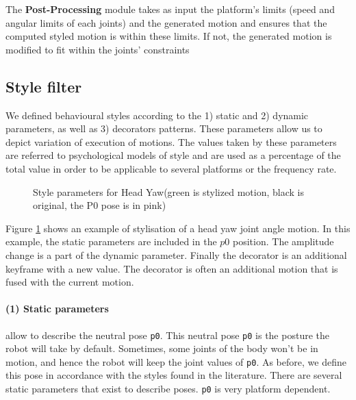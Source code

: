 \documentclass[smallextended]{svjour3}
\begin{document}
The \textbf{Post-Processing} module takes as input the platform's limits (speed and angular limits of each joints) and the generated motion and ensures that the computed styled motion is within these limits.
If not, the generated motion is modified to fit within the joints' constraints



\subsection{Style filter}
\label{ssec:bss}
We defined behavioural styles according to the 1) static and 2) dynamic parameters, as well as 3) decorators patterns. 
These parameters allow us to depict variation of execution of motions.
The values taken by these parameters are referred to psychological models of style and are used as a percentage of the total value in order to be applicable to several platforms or the frequency rate.
\begin{figure}
	\centering
	\caption{Style parameters for Head Yaw(green is stylized motion, black is original, the P0 pose is in pink)}
	\label{fig:styles_parameters}
\end{figure}

Figure \ref{fig:styles_parameters} shows an example of stylisation of a head yaw joint angle motion.
In this example, the static parameters are included in the $p0$ position.
The amplitude change is a part of the dynamic parameter. 
Finally the decorator is an additional keyframe with a new value. 
The decorator is often an additional motion that is fused with the current motion.

\paragraph{(1) Static parameters} allow to describe the neutral pose \texttt{p0}. 
This neutral pose \texttt{p0} is the posture the robot will take by default.
Sometimes, some joints of the body won't be in motion,  and hence the robot will keep the joint values of \texttt{p0}.
As before, we define this pose in accordance with the styles found in the literature. 
There are several static parameters that exist to describe poses. 
\texttt{p0} is very platform dependent. 
\end{document}
